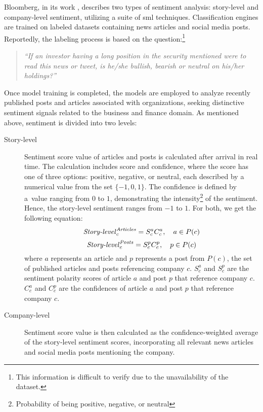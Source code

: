 Bloomberg, in its work \parencite{bloomberg}, describes two types of sentiment analysis: story-level and company-level sentiment, utilizing a suite of \acrfull{sml} techniques. Classification engines are trained on labeled datasets containing news articles and social media posts. Reportedly, the labeling process is based on the question:\footnote{This information is difficult to verify due to the unavailability of the dataset.} \begin{quote}
    \textit{``If an investor having a long position in the security mentioned were to read this news or tweet, is he/she bullish, bearish or neutral on his/her holdings?''}
\end{quote} Once model training is completed, the models are employed to analyze recently published posts and articles associated with organizations, seeking distinctive sentiment signals related to the business and finance domain. As mentioned above, sentiment is divided into two levels:\begin{description}
    \item[Story-level] Sentiment score value of articles and posts is calculated after arrival in real time. The calculation includes score and confidence, where the score has one of three options: positive, negative, or neutral, each described by a numerical value from the set $\{-1, 0, 1\}$. The confidence is defined by a~value ranging from $0$ to $1$, demonstrating the intensity\footnote{Probability of being positive, negative, or neutral} of the sentiment. Hence, the story-level sentiment ranges from $-1$ to $1$. For both, we get the following equation:
    \begin{equation}
    \label{eq:story-level-article-sentiment}
    \text{\textit{Story-level}}_{c}^{\text{\textit{Articles}}} = S_{c}^{a} C_{c}^{a}, \quad a \in P(c)
    \end{equation}
    \begin{equation}
    \label{eq:story-level-post-sentiment}
    \text{\textit{Story-level}}_{c}^{\text{\textit{Posts}}} = S_{c}^{p} C_{c}^{p}, \quad p \in P(c)
    \end{equation} where $a$ represents an article and $p$ represents a post from $P(c)$, the set of published articles and posts referencing company $c$. $S_{c}^{a}$ and $S_{c}^{p}$ are the sentiment polarity scores of article $a$ and post $p$ that reference company $c$. $C_{c}^{a}$ and $C_{c}^{p}$ are the confidences of article $a$ and post $p$ that reference company $c$.
    \item[Company-level] Sentiment score value is then calculated as the confidence-weighted average of the story-level sentiment scores, incorporating all relevant news articles and social media posts mentioning the company.

\end{description}
